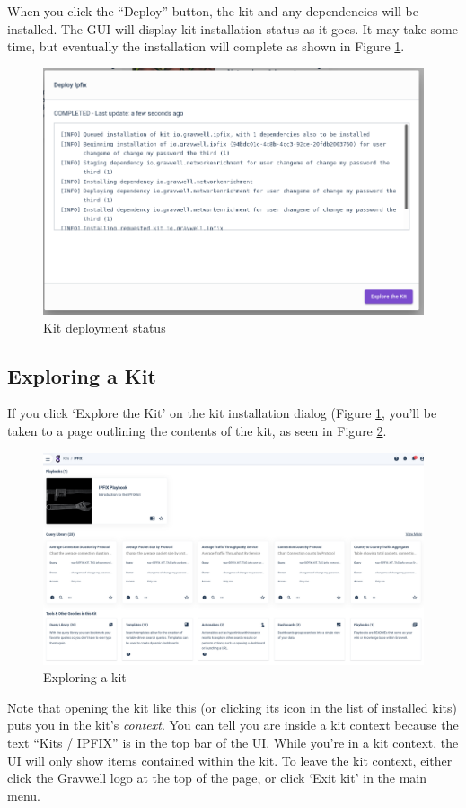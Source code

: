 When you click the ``Deploy'' button, the kit and any dependencies will be installed. The GUI will display kit installation status as it goes. It may take some time, but eventually the installation will complete as shown in Figure \ref{fig:install-done}.

\begin{figure}
	\includegraphics[width=0.6\linewidth]{images/install-done.png}
	\caption{Kit deployment status}
	\label{fig:install-done}
\end{figure}

\clearpage

\subsection{Exploring a Kit}

If you click `Explore the Kit' on the kit installation dialog (Figure \ref{fig:install-done}, you'll be taken to a page outlining the contents of the kit, as seen in Figure \ref{fig:explore}.

\begin{figure}[H]
	\includegraphics[width=0.8\linewidth]{images/explore.png}
	\caption{Exploring a kit}
	\label{fig:explore}
\end{figure}

 Note that opening the kit like this (or clicking its icon in the list of installed kits) puts you in the kit's \emph{context}. You can tell you are inside a kit context because the text ``Kits / IPFIX'' is in the top bar of the UI. While you're in a kit context, the UI will only show items contained within the kit. To leave the kit context, either click the Gravwell logo at the top of the page, or click `Exit kit' in the main menu.

